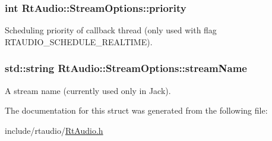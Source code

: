 \subsubsection[{priority}]{\setlength{\rightskip}{0pt plus 5cm}int Rt\+Audio\+::\+Stream\+Options\+::priority}\hypertarget{struct_rt_audio_1_1_stream_options_adfd267059434edb21573c584e6367def}{}\label{struct_rt_audio_1_1_stream_options_adfd267059434edb21573c584e6367def}
Scheduling priority of callback thread (only used with flag R\+T\+A\+U\+D\+I\+O\+\_\+\+S\+C\+H\+E\+D\+U\+L\+E\+\_\+\+R\+E\+A\+L\+T\+I\+ME). 
\subsubsection[{stream\+Name}]{\setlength{\rightskip}{0pt plus 5cm}std\+::string Rt\+Audio\+::\+Stream\+Options\+::stream\+Name}\hypertarget{struct_rt_audio_1_1_stream_options_a2a4b0b8d690c624d20f4e8f4be6ca9ba}{}\label{struct_rt_audio_1_1_stream_options_a2a4b0b8d690c624d20f4e8f4be6ca9ba}
A stream name (currently used only in Jack). 

The documentation for this struct was generated from the following file\+:\begin{DoxyCompactItemize}
\item 
include/rtaudio/\hyperlink{_rt_audio_8h}{Rt\+Audio.\+h}\end{DoxyCompactItemize}
